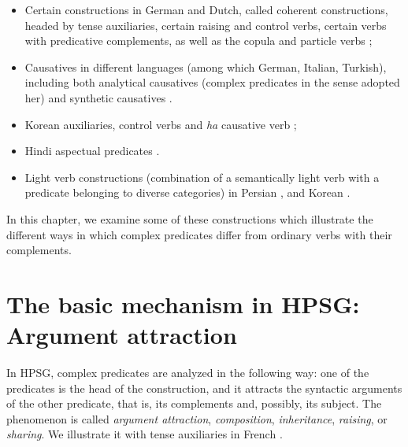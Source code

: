 \documentclass[output=paper
                ,modfonts
                ,nonflat
	        ,collection
	        ,collectionchapter
	        ,collectiontoclongg
 	        ,biblatex
                ,babelshorthands
                ,newtxmath
                ,draftmode
                ,colorlinks, citecolor=brown
]{./langsci/langscibook}
\begin{document}
{\begin{itemize}
	\item Certain constructions in German and Dutch, called coherent constructions, headed by tense auxiliaries, certain raising and control verbs, certain verbs with predicative complements, as well as the copula and particle verbs \citep{HN89b, HN94a, Rentier94, Kiss94, Kiss95a, BvN98a, HN98a, Kathol98b, Kathol2000a, Meurers2000b-Short, DM2002, dKM2001a,  Mueller2002b, Mueller2003a, muller2018clause};
	
	\item Causatives in different languages (among which German, Italian, Turkish), including both analytical causatives (complex predicates in the sense adopted her) and synthetic causatives \citep{Webelhuth98a-u}. 
	
	\item Korean auxiliaries, control verbs and \emph{ha} causative verb \citep{Chung98a-u, Sells1991, Yoo2003, Kim2016a-u};
	
	\item Hindi aspectual predicates \citep{poornima2009hindi}. 
	
	\item Light verb constructions (combination of a semantically light verb with a predicate belonging to diverse categories) in Persian \citep{bonami2010persian, MuellerPersian-unlinked, pollet2012grammaire, bonami2015diversity}, and Korean \citep{Ryu:93, lee2001argument, choi2001mixed, Kim2016a-u}.  
	
\end{itemize}


In this chapter, we examine some of these constructions which illustrate the different ways in which complex predicates differ from ordinary verbs with their complements.


\section{The basic mechanism in HPSG: Argument attraction}\label{GSsection2}
\label{complex-predicates-sec-argument-attraction}

In HPSG, complex predicates are analyzed in the following way: one of the predicates is the head of the construction, and it attracts the syntactic arguments of the other predicate, that is, its complements and, possibly, its subject. The phenomenon is called \emph{argument attraction}, \emph{composition}, \emph{inheritance}, \emph{raising}, or \emph{sharing}. We illustrate it with tense auxiliaries in French \citep{abeille1994complementation, AG2002b-u}.

}
\end{document}
